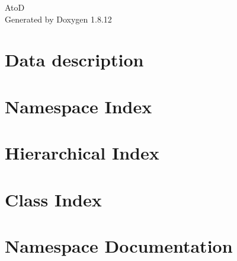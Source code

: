 \documentclass[twoside]{book}
\newcommand{\+}{\discretionary{\mbox{\scriptsize$\hookleftarrow$}}{}{}}
\newcommand{\clearemptydoublepage}{%
  \newpage{\pagestyle{empty}\cleardoublepage}%
}
\begin{document}
\hypersetup{pageanchor=false,
             bookmarksnumbered=true,
             pdfencoding=unicode
            }
\begin{titlepage}
\vspace*{7cm}
\begin{center}%
{\Large AtoD }\\
\vspace*{1cm}
{\large Generated by Doxygen 1.8.12}\\
\end{center}
\end{titlepage}
\clearemptydoublepage
{}
\tableofcontents
\clearemptydoublepage
{}
\hypersetup{pageanchor=true}

\chapter{Data description}
\label{md_atod_data__r_e_a_d_m_e}
\hypertarget{md_atod_data__r_e_a_d_m_e}{}

\chapter{Namespace Index}

\chapter{Hierarchical Index}

\chapter{Class Index}

\chapter{Namespace Documentation}












\end{document}
